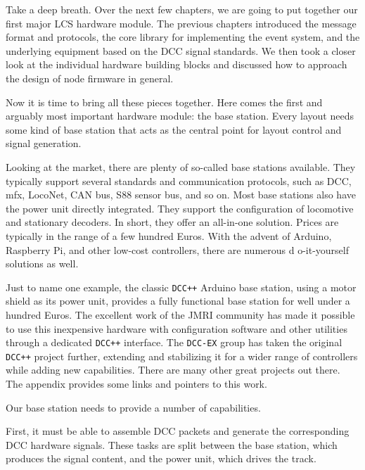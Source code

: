 
Take a deep breath. Over the next few chapters, we are going to put together our first major LCS
 hardware module. The previous chapters introduced the message format and protocols, the core 
 library for implementing the event system, and the underlying equipment based on the DCC 
 signal standards. We then took a closer look at the individual hardware building blocks and 
 discussed how to approach the design of node firmware in general.

Now it is time to bring all these pieces together. Here comes the first and arguably most 
important hardware module: the base station. Every layout needs some kind of base station 
that acts as the central point for layout control and signal generation.

Looking at the market, there are plenty of so-called base stations available. They typically
 support several standards and communication protocols, such as DCC, mfx, LocoNet, CAN bus, 
 S88 sensor bus, and so on. Most base stations also have the power unit directly integrated. 
 They support the configuration of locomotive and stationary decoders. In short, they offer 
 an all-in-one solution. Prices are typically in the range of a few hundred Euros. With the 
 advent of Arduino, Raspberry Pi, and other low-cost controllers, there are numerous d
 o-it-yourself solutions as well.

Just to name one example, the classic \texttt{DCC++} Arduino base station, using a motor 
shield as its power unit, provides a fully functional base station for well under a hundred
 Euros. The excellent work of the JMRI community has made it possible to use this inexpensive 
 hardware with configuration software and other utilities through a dedicated 
 \texttt{DCC++} interface. The \texttt{DCC-EX} group has taken the original \texttt{DCC++} 
 project further, extending and stabilizing it for a wider range of controllers while 
 adding new capabilities. There are many other great projects out there. The appendix 
 provides some links and pointers to this work.


Our base station needs to provide a number of capabilities.

First, it must be able to assemble DCC packets and generate the corresponding DCC hardware
 signals. These tasks are split between the base station, which produces the signal content, 
 and the power unit, which drives the track.

